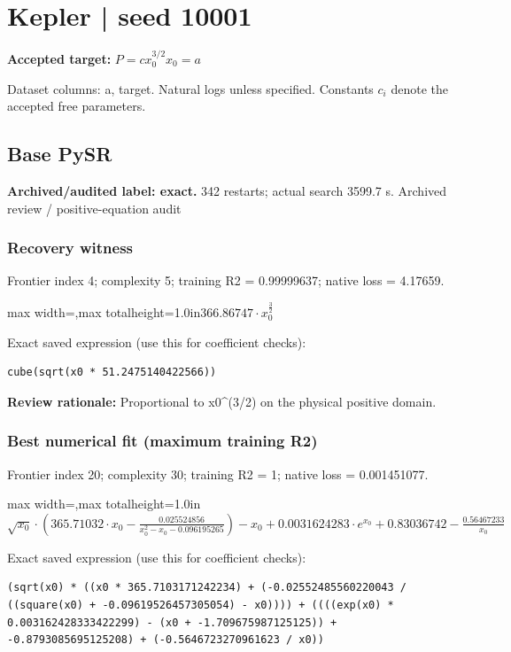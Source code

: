 \documentclass[10pt,letterpaper,landscape]{article}
\begin{document}
\section*{Kepler | seed 10001}
\textbf{Accepted target:} $\displaystyle P=c x_0^{3/2}$\hfill $x_0=a$\par
{\small Dataset columns: a, target. Natural logs unless specified. Constants $c_i$ denote the accepted free parameters.}\par\medskip
\begin{minipage}[t]{0.485\textwidth}
\subsection*{Base PySR}
\textbf{Archived/audited label: exact.} 342 restarts; actual search 3599.7 s.
{\small Archived review / positive-equation audit}
\subsubsection*{Recovery witness}
Frontier index 4; complexity 5; training R2 = 0.99999637; native loss = 4.17659.
\begin{center}\begin{adjustbox}{max width=\linewidth,max totalheight=1.0in}$\displaystyle 366.86747 \cdot x_{0}^{\frac{3}{2}}$\end{adjustbox}\end{center}
{\scriptsize Exact saved expression (use this for coefficient checks):}
\begin{lstlisting}
cube(sqrt(x0 * 51.2475140422566))
\end{lstlisting}
{\small\textbf{Review rationale:} Proportional to x0\textasciicircum{}(3/2) on the physical positive domain.}
\subsubsection*{Best numerical fit (maximum training R2)}
Frontier index 20; complexity 30; training R2 = 1; native loss = 0.001451077.
\begin{center}\begin{adjustbox}{max width=\linewidth,max totalheight=1.0in}$\displaystyle \sqrt{x_{0}} \cdot \left(365.71032 \cdot x_{0} - \frac{0.025524856}{x_{0}^{2} - x_{0} - 0.096195265}\right) - x_{0} + 0.0031624283 \cdot e^{x_{0}} + 0.83036742 - \frac{0.56467233}{x_{0}}$\end{adjustbox}\end{center}
{\scriptsize Exact saved expression (use this for coefficient checks):}
\begin{lstlisting}
(sqrt(x0) * ((x0 * 365.7103171242234) + (-0.02552485560220043 / ((square(x0) + -0.09619526457305054) - x0)))) + ((((exp(x0) * 0.003162428333422299) - (x0 + -1.709675987125125)) + -0.8793085695125208) + (-0.5646723270961623 / x0))
\end{lstlisting}
\end{minipage}\hfill
\end{document}
